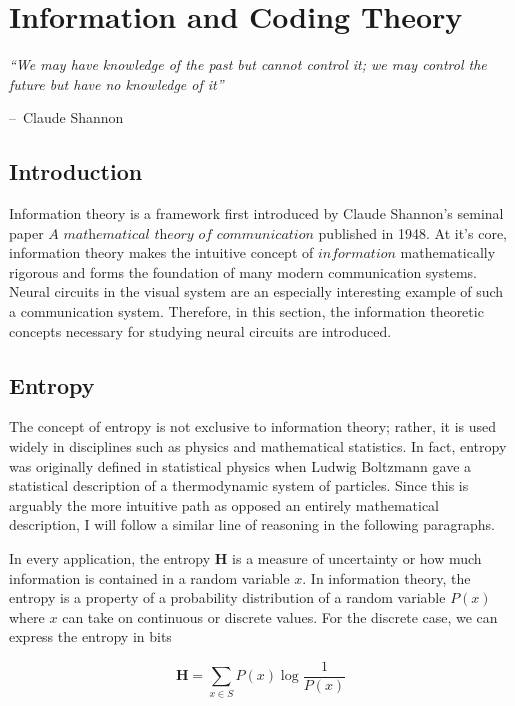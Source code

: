 \documentclass[a4paper,11pt]{book}
\makeatletter
\newenvironment{chapquote}[2][2em]
  {\setlength{\@tempdima}{#1}%
   \def\chapquote@author{#2}%
   \parshape 1 \@tempdima \dimexpr\textwidth-2\@tempdima\relax%
   \itshape}
  {\par\normalfont\hfill--\ \chapquote@author\hspace*{\@tempdima}\par\bigskip}
\makeatother
\begin{document}
\chapter{Information and Coding Theory}

\begin{chapquote}{Claude Shannon}
``We may have knowledge of the past but cannot control it; we may control the future but have no knowledge of it''
\end{chapquote}

\section{Introduction}

Information theory is a framework first introduced by Claude Shannon's seminal paper $\textit{A mathematical theory of communication}$  published in 1948. At it's core, information theory makes the intuitive concept of $\textit{information}$ mathematically rigorous and forms the foundation of many modern communication systems. Neural circuits in the visual system are an especially interesting example of such a communication system. Therefore, in this section, the information theoretic concepts necessary for studying neural circuits are introduced. 

\section{Entropy}

The concept of entropy is not exclusive to information theory; rather, it is used widely in disciplines such as physics and mathematical statistics. In fact, entropy was originally defined in statistical physics when Ludwig Boltzmann gave a statistical description of a thermodynamic system of particles. Since this is arguably the more intuitive path as opposed an entirely mathematical description, I will follow a similar line of reasoning in the following paragraphs.

In every application, the entropy $\mathbf{H}$ is a measure of uncertainty or how much information is contained in a random variable $x$. In information theory, the entropy is a property of a probability distribution of a random variable $P(x)$ where $x$ can take on continuous or discrete values. For the discrete case, we can express the entropy in bits 

\begin{equation}
\textbf{H} = \sum_{x\in S} P(x)\log\frac{1}{P(x)}
\end{equation}
\end{document}

